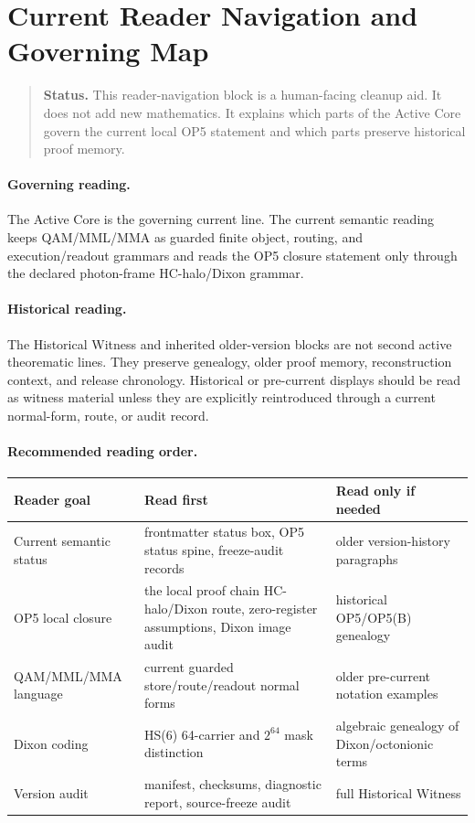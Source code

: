 \section*{Current Reader Navigation and Governing Map}
\label{sec:v410-current-reader-navigation-governing-map}

\begin{quote}\small
\noindent\textbf{Status.}
This reader-navigation block is a human-facing cleanup aid. It does not add new mathematics. It explains which parts of the Active Core govern the current local OP5 statement and which parts preserve historical proof memory.
\end{quote}

\paragraph{Governing reading.}
The Active Core is the governing current line. The current semantic reading keeps QAM/MML/MMA as guarded finite object, routing, and execution/readout grammars and reads the OP5 closure statement only through the declared photon-frame HC-halo/Dixon grammar.

\paragraph{Historical reading.}
The Historical Witness and inherited older-version blocks are not second active theorematic lines. They preserve genealogy, older proof memory, reconstruction context, and release chronology. Historical or pre-current displays should be read as witness material unless they are explicitly reintroduced through a current normal-form, route, or audit record.

\paragraph{Recommended reading order.}
\begin{center}
\scriptsize
\setlength{\tabcolsep}{2pt}
\begin{tabular}{@{}p{}P{0.37\textwidth}P{0.35\textwidth}@{}}
\toprule
Reader goal & Read first & Read only if needed\\
\midrule
Current semantic status & frontmatter status box, OP5 status spine, freeze-audit records & older version-history paragraphs\\
OP5 local closure & the local proof chain HC-halo/Dixon route, zero-register assumptions, Dixon image audit & historical OP5/OP5(B) genealogy\\
QAM/MML/MMA language & current guarded store/route/readout normal forms & older pre-current notation examples\\
Dixon coding & HS(6) 64-carrier and \(2^{64}\) mask distinction & algebraic genealogy of Dixon/octonionic terms\\
Version audit & manifest, checksums, diagnostic report, source-freeze audit & full Historical Witness\\
\bottomrule
\end{tabular}
\end{center}

